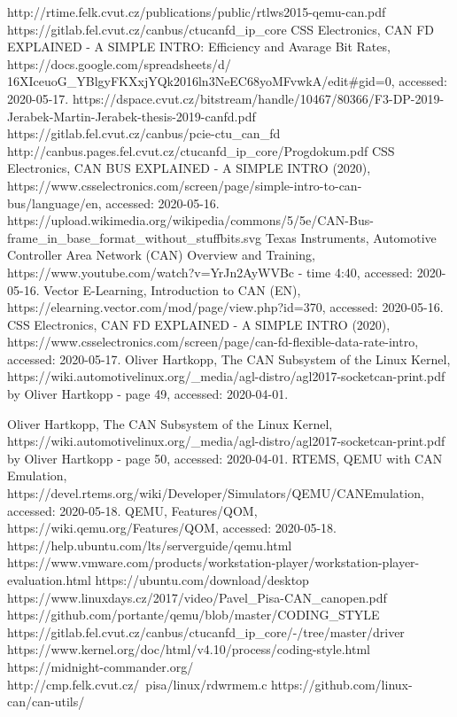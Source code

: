\documentclass{ctuthesis}
\begin{document}
 
\renewcommand\bibname{References}
\begin{thebibliography}{1}
 http://rtime.felk.cvut.cz/publications/public/rtlws2015-qemu-can.pdf
 https://gitlab.fel.cvut.cz/canbus/ctucanfd\_ip\_core
 CSS Electronics, CAN FD EXPLAINED - A SIMPLE INTRO: Efficiency and Avarage Bit Rates, https://docs.google.com/spreadsheets/d/\\16XIceuoG\_YBlgyFKXxjYQk2016ln3NeEC68yoMFvwkA/edit\#gid=0, accessed: 2020-05-17.
 https://dspace.cvut.cz/bitstream/handle/10467/80366/F3-DP-2019-Jerabek-Martin-Jerabek-thesis-2019-canfd.pdf
 https://gitlab.fel.cvut.cz/canbus/pcie-ctu\_can\_fd
 http://canbus.pages.fel.cvut.cz/ctucanfd\_ip\_core/Progdokum.pdf
 CSS Electronics, CAN BUS EXPLAINED - A SIMPLE INTRO (2020), https://www.csselectronics.com/screen/page/simple-intro-to-can-bus/language/en, accessed: 2020-05-16.
 https://upload.wikimedia.org/wikipedia/commons/5/5e/CAN-Bus-frame\_in\_base\_format\_without\_stuffbits.svg
 Texas Instruments, Automotive Controller Area Network (CAN) Overview and Training, https://www.youtube.com/watch?v=YrJn2AyWVBc - time 4:40, accessed: 2020-05-16.
 Vector E-Learning, Introduction to CAN (EN), https://elearning.vector.com/mod/page/view.php?id=370, accessed: 2020-05-16.
 CSS Electronics, CAN FD EXPLAINED - A SIMPLE INTRO (2020), https://www.csselectronics.com/screen/page/can-fd-flexible-data-rate-intro, accessed: 2020-05-17.
 Oliver Hartkopp, The CAN Subsystem of the Linux Kernel, https://wiki.automotivelinux.org/\_media/agl-distro/agl2017-socketcan-print.pdf by Oliver Hartkopp - page 49, accessed: 2020-04-01.

 Oliver Hartkopp, The CAN Subsystem of the Linux Kernel, https://wiki.automotivelinux.org/\_media/agl-distro/agl2017-socketcan-print.pdf by Oliver Hartkopp - page 50, accessed: 2020-04-01.
 RTEMS, QEMU with CAN Emulation, https://devel.rtems.org/wiki/Developer/Simulators/QEMU/CANEmulation, accessed: 2020-05-18.
 QEMU, Features/QOM, https://wiki.qemu.org/Features/QOM, accessed: 2020-05-18.
 https://help.ubuntu.com/lts/serverguide/qemu.html
 https://www.vmware.com/products/workstation-player/workstation-player-evaluation.html
 https://ubuntu.com/download/desktop
 https://www.linuxdays.cz/2017/video/Pavel\_Pisa-CAN\_canopen.pdf
 https://github.com/portante/qemu/blob/master/CODING\_STYLE
 https://gitlab.fel.cvut.cz/canbus/ctucanfd\_ip\_core/-/tree/master/driver
 https://www.kernel.org/doc/html/v4.10/process/coding-style.html
 https://midnight-commander.org/
 http://cmp.felk.cvut.cz/~pisa/linux/rdwrmem.c
 https://github.com/linux-can/can-utils/
\end{thebibliography}
 
\end{document}

